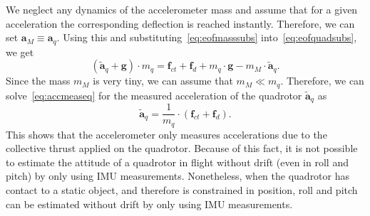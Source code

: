 \documentclass[12pt,a4paper,fleqn]{article}
\newcommand{\bVec}[1]{\mathbf{#1}}
\begin{document}
%
We neglect any dynamics of the accelerometer mass and assume that for a given acceleration the corresponding deflection is reached instantly. 
Therefore, we can set $\bVec{a}_M \equiv \bVec{a}_q$. Using this and substituting~\eqref{eq:eofmasssubs} into~\eqref{eq:eofquadsubs}, we get
%
\begin{equation}
	\left( \tilde{\bVec{a}}_q + \bVec{g} \right) \cdot m_q = \bVec{f}_{ct} + \bVec{f}_{d} + m_q\cdot \bVec{g} - m_M \cdot \tilde{\bVec{a}}_q .
	\label{eq:accmeaseq}
\end{equation}
%
Since the mass $m_M$ is very tiny, we can assume that $m_M \ll m_q$. 
Therefore, we can solve~\eqref{eq:accmeaseq} for the measured acceleration of the quadrotor $\tilde{\bVec{a}}_q$ as
%
\begin{equation}
	\tilde{\bVec{a}}_q = \frac{1}{m_q} \cdot \left( \bVec{f}_{ct} + \bVec{f}_{d} \right) .
\end{equation}
%
This shows that the accelerometer only measures accelerations due to the collective thrust applied on the quadrotor. 
Because of this fact, it is not possible to estimate the attitude of a quadrotor in flight without drift (even in roll and pitch) by only using IMU measurements. 
Nonetheless, when the quadrotor has contact to a static object, and therefore is constrained in position, roll and pitch can be estimated without drift by only using IMU measurements.

\newpage


\end{document}
